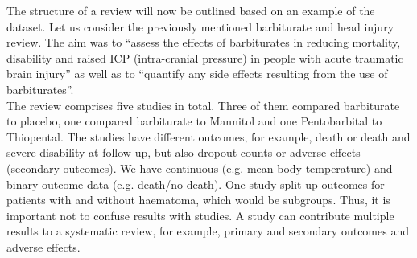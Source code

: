 \documentclass[11pt,a4paper,twoside]{book}\usepackage[]{graphicx}\usepackage[]{color}
\begin{document}
\vspace{0mm}
The structure of a review will now be outlined based on an example of the dataset. Let us consider the previously mentioned barbiturate and head injury review. The aim was to ``assess the effects of barbiturates in reducing mortality, disability and raised ICP (intra-cranial pressure) in people with acute traumatic brain injury'' as well as to ``quantify any side effects resulting from the use of barbiturates''. \\
The review comprises five studies in total. Three of them compared barbiturate to placebo, one compared barbiturate to Mannitol and one Pentobarbital to Thiopental. The studies have different outcomes, for example, death or death and severe disability at follow up, but also dropout counts or adverse effects (secondary outcomes). 
We have continuous (e.g. mean body temperature) and binary outcome data (e.g. death/no death). One study split up outcomes for patients with and without haematoma, which would be subgroups. Thus, it is important not to confuse results with studies. A study can contribute multiple results to a systematic review, for example, primary and secondary outcomes and adverse effects. 
\end{document}
